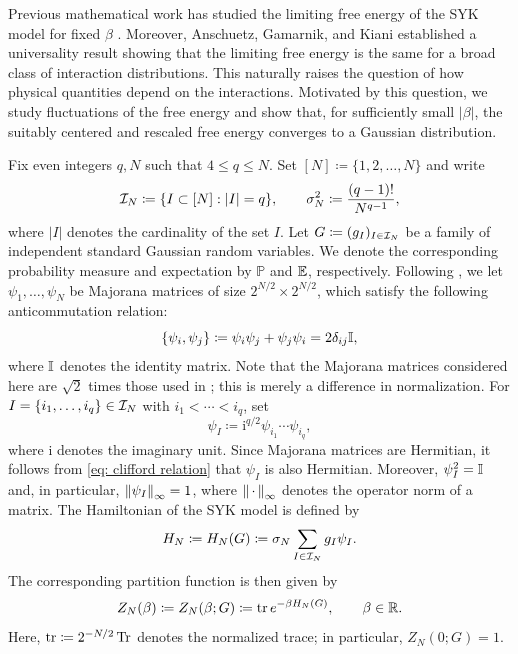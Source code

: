 \documentclass[../CLT_SYK.tex]{subfiles}
\begin{document}
Previous mathematical work has studied the limiting free energy of the SYK model for fixed $\beta$ \cite{GPSZ2026,He2026}. Moreover, Anschuetz, Gamarnik, and Kiani \cite{AGK2025} established a universality result showing that the limiting free energy is the same for a broad class of interaction distributions.  This naturally raises the question of how physical quantities depend on the interactions. Motivated by this question, we study fluctuations of the free energy and show that, for sufficiently small \(|\beta|\), the suitably centered and rescaled free energy converges to a Gaussian distribution.

Fix even integers $q,N$ such that $4\leq q\leq N$. Set $[N] \coloneqq \{1,2,\ldots,N\}$ and write
\[
  \mathcal I_N \coloneqq \{I\subset[N]:|I|=q\},\qquad
  \sigma_N^2 \coloneqq \frac{(q-1)!}{N^{q-1}},
\]
where $|I|$ denotes the cardinality of the set $I$.
Let $G \coloneqq (g_I)_{I\in\mathcal I_N}$ be a family of independent standard Gaussian random
variables. We denote the corresponding probability measure and expectation by $\mathbb P$ and $\mathbb E$, respectively. Following \cite[Section~2]{GPSZ2026}, we let $\psi_1,\ldots,\psi_N$ be Majorana matrices of size $2^{N/2} \times 2^{N/2}$, which satisfy the following anticommutation relation:
\begin{equation}
  \label{eq: clifford relation}
  \{\psi_i,\psi_j\} \coloneqq \psi_i \psi_j + \psi_j \psi_i =2\delta_{ij}\mathbb I,
\end{equation}
where $\mathbb I$ denotes the identity matrix.
Note that the Majorana matrices considered here are $\sqrt{2}$ times those used in \cite{GPSZ2026,He2026}; this is merely a difference in normalization. 
For
$I = \{i_1, \ldots, i_q\} \in \mathcal I_N$ with $i_1 < \cdots < i_q$, set
\[
  \psi_I \coloneqq \mathrm i^{q/2}\psi_{i_1}\cdots\psi_{i_q},
\]
where $\mathrm i$ denotes the imaginary unit. Since Majorana matrices are Hermitian, it follows from \eqref{eq: clifford relation} that 
$\psi_I$ is also Hermitian. Moreover, $\psi_I^2=\mathbb I$ and, in particular, $\left\lVert \psi_I\right\rVert_\infty=1$, where $\left\lVert \,\cdot\,\right\rVert_\infty$ denotes the operator norm of a matrix.  
The Hamiltonian of the SYK model is defined by 
\[
  H_N \coloneqq H_N(G) \coloneqq \sigma_N\sum_{I\in\mathcal I_N}g_I\psi_I.
\]
The corresponding partition function is then given by
\[
  Z_N(\beta) \coloneqq Z_N(\beta;G) \coloneqq \operatorname{tr} e^{-\beta H_N(G)},\qquad \beta \in \mathbb R.
\]
Here, $\operatorname{tr} \coloneqq 2^{-N/2}\operatorname{Tr}$ denotes the normalized trace; in
particular, $Z_N(0;G)=1$.  
\end{document}
